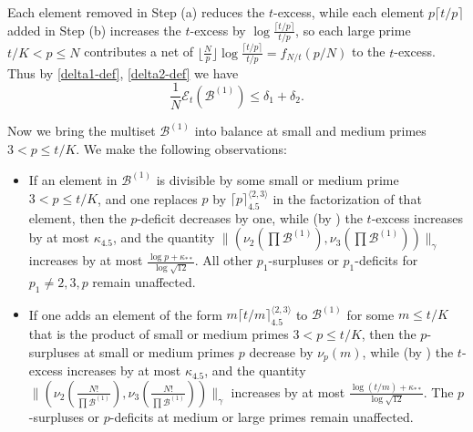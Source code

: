 \documentclass[10pt,a4paper,reqno]{amsart}
\numberwithin{equation}{section}
\theoremstyle{plain}
\theoremstyle{definition}
\newcommand\tuple{{\mathcal B}}
\newcommand\excess{{\mathcal{E}}}
\begin{document}
Each element removed in Step (a) reduces the $t$-excess, while each element $p \lceil t/p \rceil$ added in Step (b) increases the $t$-excess by $\log \frac{\lceil t/p \rceil}{t/p}$, so each large prime $t/K < p \leq N$ contributes a net of $\lfloor \frac{N}{p} \rfloor \log \frac{\lceil t/p \rceil}{t/p} = f_{N/t}(p/N)$ to the $t$-excess.  Thus by \eqref{delta1-def}, \eqref{delta2-def} we have
\begin{equation}\label{excess-1}
  \frac{1}{N} \excess_t(\tuple^{(1)}) \leq \delta_1 + \delta_2.
\end{equation}

Now we bring the multiset $\tuple^{(1)}$ into balance at small and medium primes $3 < p \leq t/K$.  We make the following observations:
\begin{itemize}
\item[(C)]  If an element in $\tuple^{(1)}$ is divisible by some small or medium prime $3 < p \leq t/K$, and one replaces $p$ by $\lceil p \rceil^{\langle 2,3 \rangle}_{4.5}$ in the factorization of that element, then the $p$-deficit decreases by one, while (by ) the $t$-excess increases by at most $\kappa_{4.5}$, and the quantity $\| (\nu_2(\prod \tuple^{(1)}),\nu_3(\prod \tuple^{(1)}))\|_\gamma$ increases by at most $\frac{\log p + \kappa_{**}}{\log \sqrt{12}}$.  All other $p_1$-surpluses or $p_1$-deficits for $p_1 \neq 2,3,p$ remain unaffected.
\item[(D)]  If one adds an element of the form $m \lceil t/m \rceil^{\langle 2,3 \rangle}_{4.5}$ to $\tuple^{(1)}$ for some $m \leq t/K$ that is the product of small or medium primes $3 < p \leq t/K$, then the $p$-surpluses at small or medium primes $p$ decrease by $\nu_p(m)$, while (by ) the $t$-excess increases by at most $\kappa_{4.5}$, and the quantity $\| (\nu_2(\frac{N!}{\prod \tuple^{(1)}}), \nu_3(\frac{N!}{\prod \tuple^{(1)}}))\|_\gamma$ increases by at most $\frac{\log(t/m) + \kappa_{**}}{\log \sqrt{12}}$.  The $p$-surpluses or $p$-deficits at medium or large primes remain unaffected.
\end{itemize}
\end{document}
